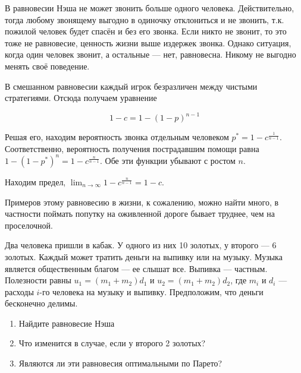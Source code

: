 \begin{solution}
В равновесии Нэша не может звонить больше одного человека. Действительно, тогда любому звонящему выгодно в одиночку отклониться и не звонить, т.к. пожилой человек будет спасён и без его звонка. Если никто не звонит, то это тоже не равновесие, ценность жизни выше издержек звонка. Однако ситуация, когда один человек звонит, а остальные --- нет, равновесна. Никому не выгодно менять своё поведение.

В смешанном равновесии каждый игрок безразличен между чистыми стратегиями. Отсюда получаем уравнение

\[
1-c=1-(1-p)^{n-1}
\]

Решая его, находим вероятность звонка отдельным человеком $p^*=1-c^{\frac{1}{n-1}}$. Соответственно, вероятность получения пострадавшим помощи равна $1-(1-p^*)^n=1-c^{\frac{n}{n-1}}$. Обе эти функции убывают с ростом $n$.

Находим предел, $\lim_{n\to\infty} 1-c^{\frac{n}{n-1}} = 1-c$.

Примеров этому равновесию в жизни, к сожалению, можно найти много, в частности поймать попутку на оживленной дороге бывает труднее, чем на проселочной.

\end{solution}

\begin{problem} 
Два человека пришли в кабак. У одного из них 10 золотых, у второго --- 6 золотых. Каждый может тратить деньги на выпивку или на музыку.
Музыка является общественным благом --- ее слышат все. Выпивка --- частным. Полезности равны $u_{1}=(m_{1}+m_{2})d_{1}$ и
$u_{2}=(m_{1}+m_{2})d_{2}$, где $m_{i}$ и $d_{i}$ --- расходы $i$-го
человека на музыку и выпивку. Предположим, что деньги бесконечно
делимы. 
\begin{enumerate}
\item Найдите равновесие Нэша 
\item Что изменится в случае, если у второго 2 золотых? 
\item Являются ли эти равновесия оптимальными по Парето? 
\end{enumerate}
\end{problem}


